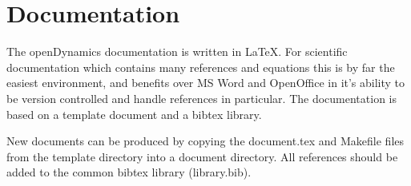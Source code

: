 \chapter{Documentation}
The openDynamics documentation is written in \LaTeX. For scientific documentation which contains many references and equations this is by far the easiest environment, and benefits over MS Word and OpenOffice in it's ability to be version controlled and handle references in particular. The documentation is based on a template document and a bibtex library.

New documents can be produced by copying the document.tex and Makefile files from the template directory into a document directory. All references should be added to the common bibtex library (library.bib).